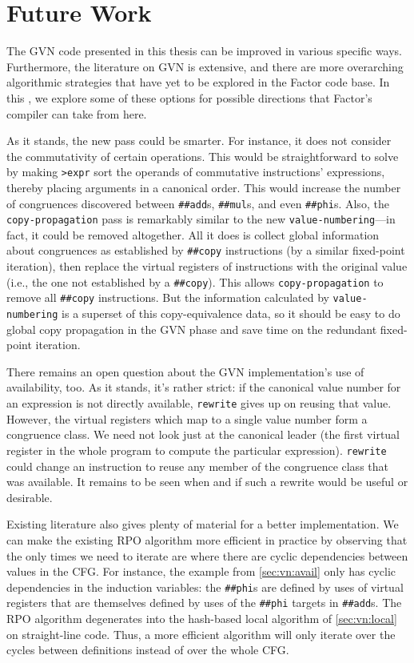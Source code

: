 \section{Future Work}\label{sec:vn:future}

The \gls{GVN} code presented in this thesis can be improved in various specific
ways.  Furthermore, the literature on \gls{GVN} is extensive, and there are
more overarching algorithmic strategies that have yet to be explored in the
Factor code base.  In this , we explore some of these
options for possible directions that Factor's compiler can take from here.

As it stands, the new pass could be smarter.  For instance, it does not
consider the commutativity of certain operations.  This would be
straightforward to solve by making \Verb|>expr| sort the operands of
commutative instructions' expressions, thereby placing arguments in a canonical
order.  This would increase the number of congruences discovered between
\Verb|##add|s, \Verb|##mul|s, and even \Verb|##phi|s.  Also, the
\Verb|copy-propagation| pass is remarkably similar to the new
\Verb|value-numbering|---in fact, it could be removed altogether.  All it
does is collect global information about congruences as established by
\Verb|##copy| instructions (by a similar fixed-point iteration), then replace
the virtual registers of instructions with the original value (i.e., the one
not established by a \Verb|##copy|).  This allows \Verb|copy-propagation| to
remove all \Verb|##copy| instructions.  But the information calculated by
\Verb|value-numbering| is a superset of this copy-equivalence data, so it
should be easy to do global copy propagation in the \gls{GVN} phase and save
time on the redundant fixed-point iteration.

There remains an open question about the \gls{GVN} implementation's use of
availability, too.  As it stands, it's rather strict: if the canonical value
number for an expression is not directly available, \Verb|rewrite| gives up
on reusing that value.  However, the virtual registers which map to a single
value number form a congruence class.  We need not look just at the canonical
leader (the first virtual register in the whole program to compute the
particular expression).  \Verb|rewrite| could change an instruction to reuse
any member of the congruence class that was available.  It remains to be seen
when and if such a rewrite would be useful or desirable.

Existing literature also gives plenty of material for a better implementation.
We can make the existing \gls{RPO} algorithm more efficient in practice by
observing that the only times we need to iterate are where there are cyclic
dependencies between values in the \gls{CFG}.  For instance, the example from
\cref{sec:vn:avail} only has cyclic dependencies in the induction variables:
the \Verb|##phi|s are defined by uses of virtual registers that are themselves
defined by uses of the \Verb|##phi| targets in \Verb|##add|s.  The \gls{RPO}
algorithm degenerates into the hash-based local algorithm of
\cref{sec:vn:local} on straight-line code.  Thus, a more efficient algorithm
will only iterate over the cycles between definitions instead of over the whole
\gls{CFG}.  

